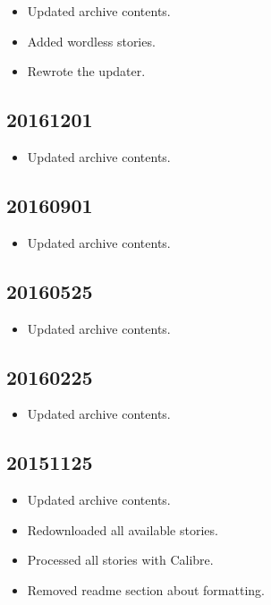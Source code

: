 \documentclass[hidelinks,a4paper,12pt]{article}
\begin{document}
\begin{itemize}
\item Updated archive contents.
\item Added wordless stories.
\item Rewrote the updater.
\end{itemize}

\subsection{20161201}  \label{sec:changelog_20161201}

\begin{itemize}
\item Updated archive contents.
\end{itemize}

\subsection{20160901}  \label{sec:changelog_20160901}

\begin{itemize}
\item Updated archive contents.
\end{itemize}

\subsection{20160525}  \label{sec:changelog_20160525}

\begin{itemize}
\item Updated archive contents.
\end{itemize}

\subsection{20160225}  \label{sec:changelog_20160225}

\begin{itemize}
\item Updated archive contents.
\end{itemize}

\subsection{20151125}  \label{sec:changelog_20151125}

\begin{itemize}
\item Updated archive contents.
\item Redownloaded all available stories.
\item Processed all stories with Calibre.
\item Removed readme section about formatting.
\end{itemize}
\end{document}
